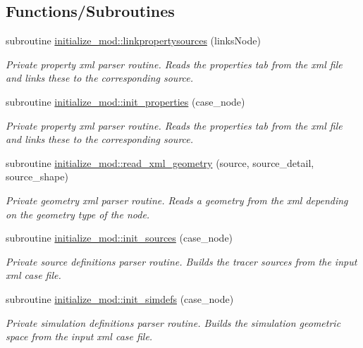 \subsection*{Functions/\+Subroutines}
\begin{DoxyCompactItemize}
\item 
subroutine \hyperlink{namespaceinitialize__mod_af38ade977df8d56db1d125bc4cc03a4a}{initialize\+\_\+mod\+::linkpropertysources} (links\+Node)
\begin{DoxyCompactList}\small\item\em Private property xml parser routine. Reads the properties tab from the xml file and links these to the corresponding source. \end{DoxyCompactList}\item 
subroutine \hyperlink{namespaceinitialize__mod_a4c7a93dca8bb7b573e91f877033ab22a}{initialize\+\_\+mod\+::init\+\_\+properties} (case\+\_\+node)
\begin{DoxyCompactList}\small\item\em Private property xml parser routine. Reads the properties tab from the xml file and links these to the corresponding source. \end{DoxyCompactList}\item 
subroutine \hyperlink{namespaceinitialize__mod_aebe8236f74bc6665b16463683c478602}{initialize\+\_\+mod\+::read\+\_\+xml\+\_\+geometry} (source, source\+\_\+detail, source\+\_\+shape)
\begin{DoxyCompactList}\small\item\em Private geometry xml parser routine. Reads a geometry from the xml depending on the geometry type of the node. \end{DoxyCompactList}\item 
subroutine \hyperlink{namespaceinitialize__mod_aae6a35bca190cdf65a6146f254264cd1}{initialize\+\_\+mod\+::init\+\_\+sources} (case\+\_\+node)
\begin{DoxyCompactList}\small\item\em Private source definitions parser routine. Builds the tracer sources from the input xml case file. \end{DoxyCompactList}\item 
subroutine \hyperlink{namespaceinitialize__mod_a18736cca205403067232125b8e510ab2}{initialize\+\_\+mod\+::init\+\_\+simdefs} (case\+\_\+node)
\begin{DoxyCompactList}\small\item\em Private simulation definitions parser routine. Builds the simulation geometric space from the input xml case file. \end{DoxyCompactList}\item 

\end{DoxyCompactItemize}
